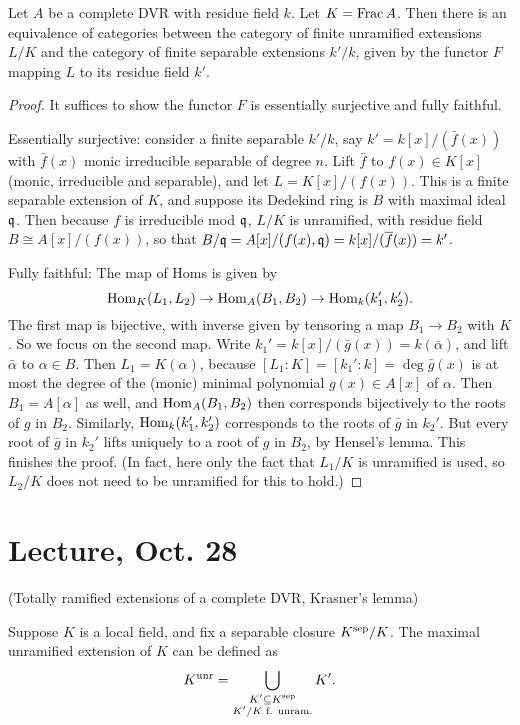 \documentclass[11pt]{amsart}
\begin{document}
\begin{thm}
Let $A$ be a complete DVR with residue field $k$. Let $K = \operatorname{Frac} A$. Then there is an equivalence of categories between the category of finite unramified extensions $L/K$ and the category of finite separable extensions $k'/k$, given by the functor $F$ mapping $L$ to its residue field $k'$.
\end{thm}

\begin{proof}
It suffices to show the functor $F$ is essentially surjective and fully faithful.

Essentially surjective: consider a finite separable $k'/k$, say $k' = k[x]/(\bar{f}(x))$ with $\bar{f}(x)$ monic irreducible separable of degree $n$. Lift $\bar{f}$ to $f(x)\in K[x]$ (monic, irreducible and separable), and let $L = K[x]/(f(x))$. This is a finite separable extension of $K$, and suppose its Dedekind ring is $B$ with maximal ideal $\mathfrak{q}$. Then because $f$ is irreducible mod $\mathfrak{q}$, $L/K$ is unramified, with residue field $B \cong A[x]/(f(x))$, so that $B/\mathfrak{q} = A[x]/(f(x),\mathfrak{q}) = k[x]/(\overline{f}(x)) = k'$.
    
Fully faithful: The map of Homs is given by
\[\operatorname{Hom}_K(L_1,L_2) \to \operatorname{Hom}_A(B_1,B_2) \to \operatorname{Hom}_k(k_1',k_2').\]
The first map is bijective, with inverse given by tensoring a map $B_1\to B_2$ with $K$. So we focus on the second map. Write $k_1' = k[x]/(\bar{g}(x)) = k(\bar{\alpha})$, and lift $\bar{\alpha}$ to $\alpha\in B$.  Then $L_1 = K(\alpha)$, because $[L_1:K] = [k_1':k] = \deg \bar{g}(x)$ is at most the degree of the (monic) minimal polynomial $g(x)\in A[x]$ of $\alpha$. Then $B_1 = A[\alpha]$ as well, and $\operatorname{Hom}_A(B_1,B_2)$ then corresponds bijectively to the roots of $g$ in $B_2$. Similarly, $\operatorname{Hom}_k(k_1',k_2')$ corresponds to the roots of $\bar{g}$ in $k_2'$. But every root of $\bar{g}$ in $k_2'$ lifts uniquely to a root of $g$ in $B_2$, by Hensel's lemma. This finishes the proof. (In fact, here only the fact that $L_1/K$ is unramified is used, so $L_2/K$ does not need to be unramified for this to hold.)
\end{proof}


\section{Lecture, Oct. 28}

(Totally ramified extensions of a complete DVR, Krasner's lemma)

Suppose $K$ is a local field, and fix a separable closure $K^{\operatorname{sep}}/K$. The maximal unramified extension of $K$ can be defined as
\[K^{\operatorname{unr}} = \bigcup_{\substack{K'\subseteq K^{\operatorname{sep}} \\ K'/K \text{ f. unram.}}} K'.\]
\end{document}
